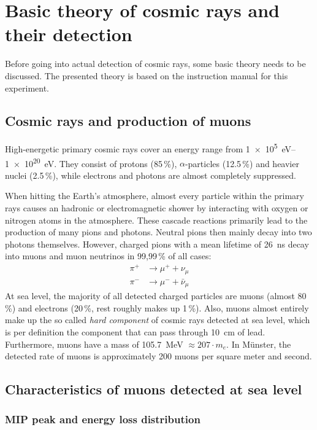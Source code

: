 \section{Basic theory of cosmic rays and their detection}
	
Before going into actual detection of cosmic rays, some basic theory needs to be discussed.
The presented theory is based on the instruction manual for this experiment\cite{wwu}.
	

\subsection{Cosmic rays and production of muons}

High-energetic primary cosmic rays cover an energy range from \SIrange{1e5}{1e20}{\electronvolt}.
They consist of protons (85\,\%), $\alpha$-particles (12.5\,\%) and heavier nuclei (2.5\,\%), while electrons and photons are almost completely suppressed.

When hitting the Earth's atmosphere, almost every particle within the primary rays causes an hadronic or electromagnetic shower by interacting with oxygen or nitrogen atoms in the atmosphere.
These cascade reactions primarily lead to the production of many pions and photons.
Neutral pions then mainly decay into two photons themselves.
However, charged pions with a mean lifetime of \SI{26}{\nano\second}\cite{pdg} decay into muons and muon neutrinos in 99,99\,\% of all cases:
\begin{align}
	\pi^+&\longrightarrow \mu^++\nu_\mu\\
	\pi^-&\longrightarrow \mu^-+\bar{\nu}_\mu
\end{align}
At sea level, the majority of all detected charged particles are muons (almost 80\,\%) and electrons (20\,\%, rest roughly makes up 1\,\%).
Also, muons almost entirely make up the so called \emph{hard component} of cosmic rays detected at sea level, which is per definition the component that can pass through \SI{10}{\centi\meter} of lead.
Furthermore, muons have a mass of \SI{105.7}{\mega\electronvolt} $\approx 207 \cdot m_e$.
In Münster, the detected rate of muons is approximately 200 muons per square meter and second.

\subsection{Characteristics of muons detected at sea level}

\subsubsection{MIP peak and energy loss distribution} \label{PeakEnergyLossDistribution}

